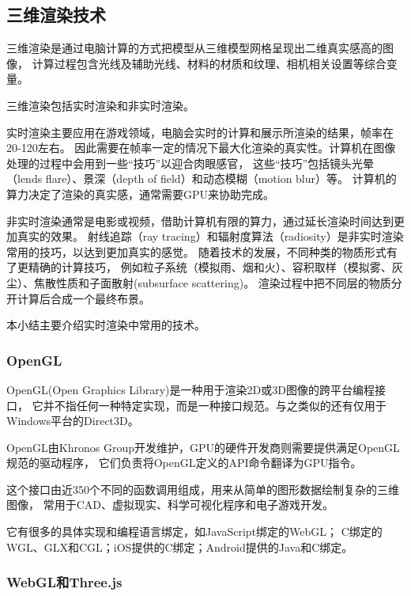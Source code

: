 \subsection{三维渲染技术}

三维渲染是通过电脑计算的方式把模型从三维模型网格呈现出二维真实感高的图像\cite{3DModels_SurveyPaper}，
计算过程包含光线及辅助光线、材料的材质和纹理、相机相关设置等综合变量\cite{scientce-of-3d-rendering}。

三维渲染包括实时渲染和非实时渲染。

实时渲染主要应用在游戏领域，电脑会实时的计算和展示所渲染的结果，帧率在20-120左右。
因此需要在帧率一定的情况下最大化渲染的真实性。计算机在图像处理的过程中会用到一些“技巧”以迎合肉眼感官，
这些“技巧”包括镜头光晕（lends flare）、景深（depth of field）和动态模糊（motion blur）等。
计算机的算力决定了渲染的真实感，通常需要GPU来协助完成。

非实时渲染通常是电影或视频，借助计算机有限的算力，通过延长渲染时间达到更加真实的效果。
射线追踪（ray tracing）和辐射度算法（radiosity）是非实时渲染常用的技巧，以达到更加真实的感觉。
随着技术的发展，不同种类的物质形式有了更精确的计算技巧，
例如粒子系统（模拟雨、烟和火）、容积取样（模拟雾、灰尘）、焦散性质和子面散射(subsurface scattering)。
渲染过程中把不同层的物质分开计算后合成一个最终布景。

本小结主要介绍实时渲染中常用的技术。

\subsubsection{OpenGL}

OpenGL(Open Graphics Library)是一种用于渲染2D或3D图像的跨平台编程接口\cite{opengl}，
它并不指任何一种特定实现，而是一种接口规范。与之类似的还有仅用于Windows平台的Direct3D。

OpenGL由Khronos Group开发维护，GPU的硬件开发商则需要提供满足OpenGL规范的驱动程序，
它们负责将OpenGL定义的API命令翻译为GPU指令。

这个接口由近350个不同的函数调用组成，用来从简单的图形数据绘制复杂的三维图像，
常用于CAD、虚拟现实、科学可视化程序和电子游戏开发。 

它有很多的具体实现和编程语言绑定，如JavaScript绑定的WebGL；
C绑定的WGL、GLX和CGL；iOS提供的C绑定；Android提供的Java和C绑定。

\subsubsection{WebGL和Three.js}

